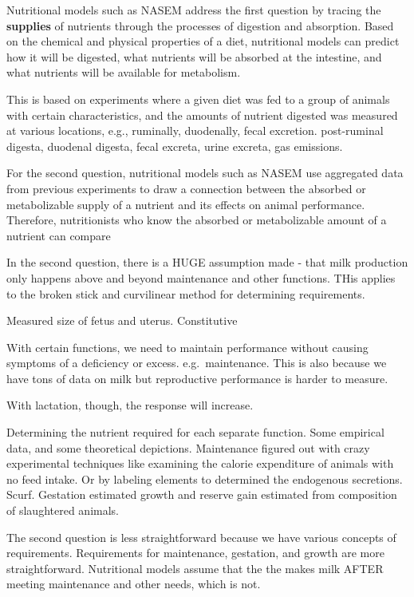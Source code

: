 \documentclass[
]{book}
\begin{document}
Nutritional models such as NASEM \citeyearpar{NASEM8} address the first question by tracing the \textbf{supplies} of nutrients through the processes of digestion and absorption. Based on the chemical and physical properties of a diet, nutritional models can predict how it will be digested, what nutrients will be absorbed at the intestine, and what nutrients will be available for metabolism.

This is based on experiments where a given diet was fed to a group of animals with certain characteristics, and the amounts of nutrient digested was measured at various locations, e.g., ruminally, duodenally, fecal excretion.
post-ruminal digesta, duodenal digesta, fecal excreta, urine excreta, gas emissions.

For the second question, nutritional models such as NASEM \citeyearpar{NASEM8} use aggregated data from previous experiments to draw a connection between the absorbed or metabolizable supply of a nutrient and its effects on animal performance. Therefore, nutritionists who know the absorbed or metabolizable amount of a nutrient can compare

In the second question, there is a HUGE assumption made - that milk production only happens above and beyond maintenance and other functions. THis applies to the broken stick and curvilinear method for determining requirements.

Measured size of fetus and uterus. Constitutive

With certain functions, we need to maintain performance without causing symptoms of a deficiency or excess. e.g.~maintenance. This is also because we have tons of data on milk but reproductive performance is harder to measure.

With lactation, though, the response will increase.

Determining the nutrient required for each separate function. Some empirical data, and some theoretical depictions.
Maintenance figured out with crazy experimental techniques like examining the calorie expenditure of animals with no feed intake. Or by labeling elements to determined the endogenous secretions.
Scurf.
Gestation estimated
growth and reserve gain estimated from composition of slaughtered animals.

The second question is less straightforward because we have various concepts of requirements.
Requirements for maintenance, gestation, and growth are more straightforward.
Nutritional models assume that the the makes milk AFTER meeting maintenance and other needs, which is not.
\end{document}
